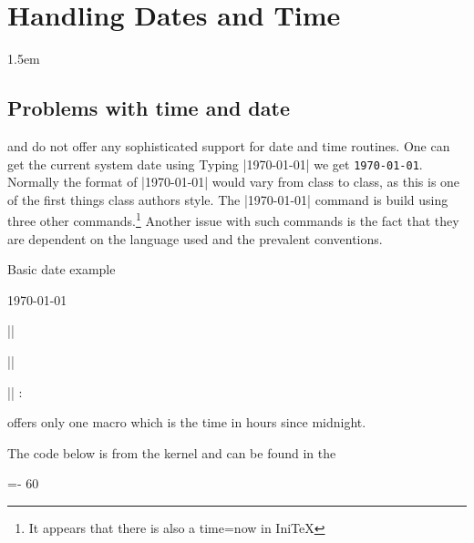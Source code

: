 
\makeatletter\@specialtrue\makeatother
{}
\chapter{Handling Dates and Time}
\label{dates}\label{ch:dates}

\parindent1.5em

\section{Problems with time and date}

\tex and \latex do not offer\cite{Thanh:TB18-4-249} any sophisticated support for date and time routines.
One can get the current system date using \cmd{\today}
Typing |\today| we get \texttt{\today}. Normally the format of |\today| would vary from class to class, as this is one of the first things class authors style. The |\today| command is build using three other commands.\footnote{It appears that there is also a time=now in IniTeX} Another issue with such commands is the fact that they are dependent on the language used and the prevalent conventions.

\begin{texexample}{Basic date example}{}
\the\day

\the\month

\the\year

\meaning\today
\end{texexample}

{
\makeatletter
|\the\month| \the\month

|\the\day| \the\day

|\the\time| \two@digits{\the\count@}:
\makeatother}

\tex offers only one macro \cmd{\time} which is the time in hours since midnight.


The code below is from the \latex kernel and can be found in the 

\begin{teX}
\count@\time
\divide{}
=-\count@
\multiply{} 60
\advance{} \time

\edef\today{%
  \the\year/\two@digits{\the\month}/\two@digits{\the\day}:%
  \two@digits{\the\count@}:\two@digits{\the\count2}
 }
\end{teX}

